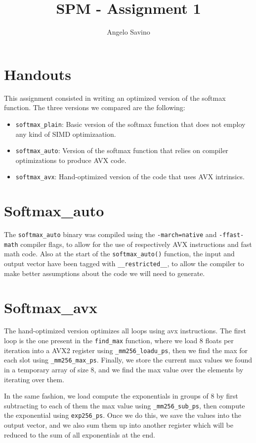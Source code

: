 \documentclass[12pt,a4paper]{article}
\title{SPM - Assignment 1}
\author{Angelo Savino}
\begin{document}
\maketitle

\section{Handouts}
This assignment consisted in writing an optimized version of the softmax function. The three versions we compared are the following:
\begin{itemize}
    \item \texttt{softmax\_plain}: Basic version of the softmax function that does not employ any kind of SIMD optimizaation.
    \item \texttt{softmax\_auto}: Version of the softmax function that relies on compiler optimizations to produce AVX code. 
    \item \texttt{softmax\_avx}: Hand-optimized version of the code that uses AVX intrinsics.
\end{itemize}

\section{Softmax\_auto}
The \texttt{softmax\_auto} binary was compiled using the \texttt{-march=native} and \texttt{-ffast-math} compiler flags, to allow for the use of respectively AVX instructions and fast math code.
Also at the start of the \texttt{softmax\_auto()} function, the input and output vector have been tagged with \texttt{\_\_restricted\_\_}, to allow the compiler to make better assumptions about the code we will need to generate. 

\section{Softmax\_avx}
The hand-optimized version optimizes all loops using avx instructions. The first loop is the one present in the \texttt{find\_max} function, where we load 8 floats per iteration into a AVX2 register using \texttt{\_mm256\_loadu\_ps}, then we find the max for each slot using \texttt{\_mm256\_max\_ps}. Finally, we store the current max values we found in a temporary array of size 8, and we find the max value over the elements by iterating over them. 

In the same fashion, we load compute the exponentials in groups of 8 by first subtracting to each of them the max value using \texttt{\_mm256\_sub\_ps}, then compute the exponential using \texttt{exp256\_ps}. Once we do this, we save the values into the output vector, and we also sum them up into another register which will be reduced to the sum of all exponentials at the end.
\end{document}
